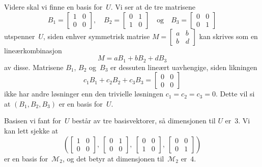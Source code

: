 \documentclass[notitlepage,a4paper,12pt,norsk]{IMFeksamen}
\newcommand{\M}{\mathcal{M}} %
\newcommand{\0}{\V{0}}
\newcommand{\oppgslutt}{
\begin{center}
\pgfornament[width=6cm]{88}
\end{center}
}
\newenvironment{losning}{\begin{oppgave}}{\oppgslutt\end{oppgave}}
\begin{document}
\begin{losning}
Videre skal vi finne en basis for~$U$.
Vi ser at de tre matrisene
\[
B_1 =
\begin{bmatrix}
1 & 0 \\
0 & 0
\end{bmatrix},\quad
B_2 =
\begin{bmatrix}
0 & 1 \\
1 & 0
\end{bmatrix}\quad
\text{og}\quad
B_3 =
\begin{bmatrix}
0 & 0 \\
0 & 1
\end{bmatrix}
\]
utspenner~$U$, siden enhver symmetrisk matrise
$
M =
\left[
\begin{smallmatrix}
a & b \\
b & d
\end{smallmatrix}
\right]
$
kan skrives som en lineærkombinasjon
\[
M = a B_1 + b B_2 + d B_3
\]
av disse.
Matrisene $B_1$, $B_2$ og~$B_3$ er dessuten lineært uavhengige,
siden likningen
\[
c_1 B_1 + c_2 B_2 + c_3 B_3 =
\begin{bmatrix}
0 & 0 \\
0 & 0
\end{bmatrix}
\]
ikke har andre løsninger enn den trivielle løsningen $c_1=c_2=c_3=0$.
Dette vil si at $(B_1,B_2,B_3)$ er en basis for~$U$.

Basisen vi fant for~$U$ består av tre basisvektorer,
så dimensjonen til $U$ er~$3$.
Vi kan lett sjekke at
\[
\left(
\begin{bmatrix}
1 & 0 \\
0 & 0
\end{bmatrix},\ %
\begin{bmatrix}
0 & 1 \\
0 & 0
\end{bmatrix},\ %
\begin{bmatrix}
0 & 0 \\
1 & 0
\end{bmatrix},\ %
\begin{bmatrix}
0 & 0 \\
0 & 1
\end{bmatrix}
\right)
\]
er en basis for~$\M_2$,
og det betyr at dimensjonen til~$\M_2$ er~$4$.
\end{losning}
\end{document}
